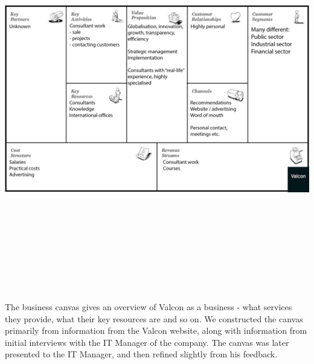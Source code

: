 \includegraphics[angle=90,height=475pt]{inline/business-model-canvas.png}

The business canvas gives an overview of Valcon as a business - what services they provide, what their key resources are and so on.
We constructed the canvas primarily from information from the Valcon website, along with information from initial interviews with the IT Manager of the company.
The canvas was later presented to the IT Manager, and then refined slightly from his feedback.